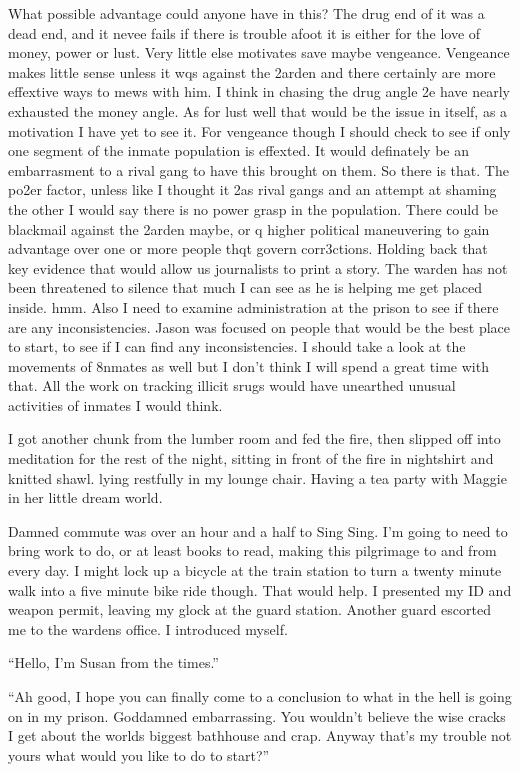 What possible advantage could anyone have in this? The drug end of it was a dead end, and it nevee fails if there is trouble afoot it is either for the love of money, power or lust. Very little else motivates save maybe vengeance. Vengeance makes little sense unless it wqs against the 2arden and there certainly are more effextive ways to mews with him. I think in chasing the drug angle 2e have nearly exhausted the money angle. As for lust well that would be the issue in itself, as a motivation I have yet to see it. For vengeance though I should check to see if only one segment of the inmate population is effexted. It would definately be an embarrasment to a rival gang to have this brought on them. So there is that. The po2er factor, unless like I thought it 2as rival gangs and an attempt at shaming the other I would say there is no power grasp in the population. There could be blackmail against the 2arden maybe, or q higher political maneuvering to gain advantage over one or more people thqt govern corr3ctions. Holding back that key evidence that would allow us journalists to print a story. The warden has not been threatened to silence that much I can see as he is helping me get placed inside. hmm. Also I need to examine administration at the prison to see if there are any inconsistencies. Jason was focused on people that would be the best place to start, to see if I can find any inconsistencies. I should take a look at the movements of 8nmates as well but I don't think I will spend a great time with that. All the work on tracking illicit srugs would have unearthed unusual activities of inmates I would think.

I got another chunk from the lumber room and fed the fire, then slipped off into meditation for the rest of the night, sitting in front of the fire in nightshirt and knitted shawl. lying restfully in my lounge chair. Having a tea party with Maggie in her little dream world.

Damned commute was over an hour and a half to Sing Sing. I'm going to need to bring work to do, or at least books to read, making this pilgrimage to and from every day. I might lock up a bicycle at the train station to turn a twenty minute walk into a five minute bike ride though. That would help. I presented my ID and weapon permit, leaving my glock at the guard station. Another guard escorted me to the wardens office. I introduced myself.

``Hello, I'm Susan from the times.''

``Ah good, I hope you can finally come to a conclusion to what in the hell is going on in my prison. Goddamned embarrassing. You wouldn't believe the wise cracks I get about the worlds biggest bathhouse and crap. Anyway that's my trouble not yours what would you like to do to start?''

